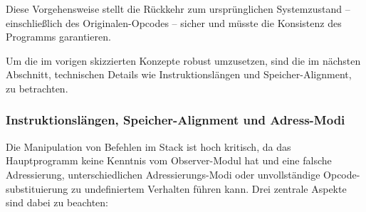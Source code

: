 Diese Vorgehensweise stellt die R\"uckkehr zum urspr\"unglichen Systemzustand – einschlie{\ss}lich des Originalen-Opcodes – sicher und m\"usste die Konsistenz des Programms garantieren.

Um die im vorigen  skizzierten Konzepte robust umzusetzen, sind die im n\"achsten Abschnitt, technischen Details wie Instruktionsl\"angen und Speicher-Alignment, zu betrachten.\AI


\newpage
\subsubsection{Instruktionsl\"angen, Speicher-Alignment und Adress-Modi}
\label{sec:TechnischeUmsetzunSoftwareBreakpoints}

Die Manipulation von Befehlen im Stack ist hoch kritisch, da das Hauptprogramm keine Kenntnis vom Observer-Modul hat und eine falsche Adressierung, unterschiedlichen Adressierungs-Modi oder unvollst\"andige Opcode-substituierung zu undefiniertem Verhalten f\"uhren kann. Drei zentrale Aspekte sind dabei zu beachten:

